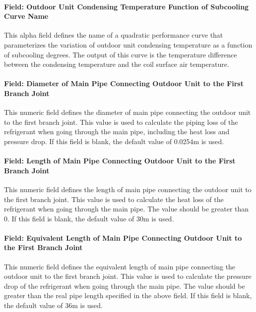 \paragraph{Field: Outdoor Unit Condensing Temperature Function of Subcooling Curve Name}\label{field-outdoor-unit-condensing-temperature-function-of-subcooling-curve-name}

This alpha field defines the name of a quadratic performance curve that parameterizes the variation of outdoor unit condensing temperature as a function of subcooling degrees. The output of this curve is the temperature difference between the condensing temperature and the coil surface air temperature.

\paragraph{Field: Diameter of Main Pipe Connecting Outdoor Unit to the First Branch Joint}\label{field-diameter-of-main-pipe-connecting-outdoor-unit-to-indoor-units}

This numeric field defines the diameter of main pipe connecting the outdoor unit to the first branch joint. This value is used to calculate the piping loss of the refrigerant when going through the main pipe, including the heat loss and pressure drop. If this field is blank, the default value of 0.0254m is used.

\paragraph{Field: Length of Main Pipe Connecting Outdoor Unit to the First Branch Joint}\label{field-length-of-main-pipe-connecting-outdoor-unit-to-indoor-units}

This numeric field defines the length of main pipe connecting the outdoor unit to the first branch joint. This value is used to calculate the heat loss of the refrigerant when going through the main pipe. The value should be greater than 0. If this field is blank, the default value of 30m is used.

\paragraph{Field: Equivalent Length of Main Pipe Connecting Outdoor Unit to the First Branch Joint}\label{field-equivalent-length-of-main-pipe-connecting-outdoor-unit-to-indoor-units}

This numeric field defines the equivalent length of main pipe connecting the outdoor unit to the first branch joint. This value is used to calculate the pressure drop of the refrigerant when going through the main pipe. The value should be greater than the real pipe length specified in the above field. If this field is blank, the default value of 36m is used.

